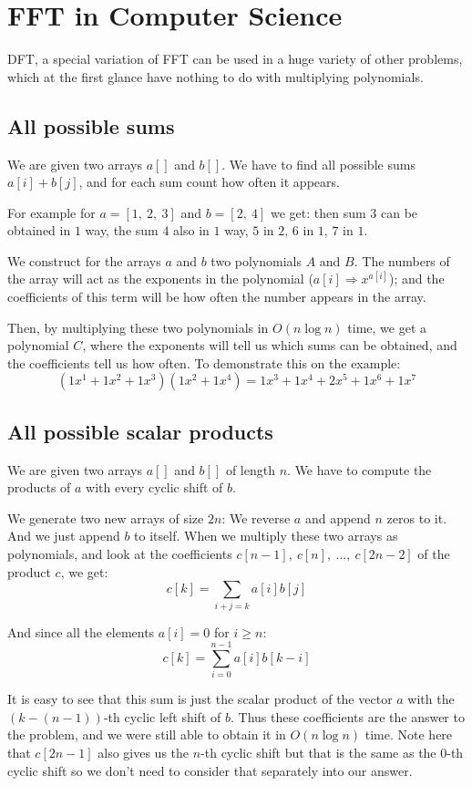 \documentclass{report}
\begin{document}
\section{FFT in Computer Science}
DFT, a special variation of FFT can be used in a huge variety of other problems, which at the first glance have nothing to do with multiplying polynomials.

\subsection{All possible sums}

We are given two arrays $a[]$ and $b[]$. We have to find all possible sums $a[i] + b[j]$, and for each sum count how often it appears.

For example for $a = [1,~ 2,~ 3]$ and $b = [2,~ 4]$ we get: then sum $3$ can be obtained in $1$ way, the sum $4$ also in $1$ way, $5$ in $2$, $6$ in $1$, $7$ in $1$.

We construct for the arrays $a$ and $b$ two polynomials $A$ and $B$. The numbers of the array will act as the exponents in the polynomial ($a[i] \Rightarrow x^{a[i]}$); and the coefficients of this term will be how often the number appears in the array.

Then, by multiplying these two polynomials in $O(n \log n)$ time, we get a polynomial $C$, where the exponents will tell us which sums can be obtained, and the coefficients tell us how often. To demonstrate this on the example:
$$(1 x^1 + 1 x^2 + 1 x^3) (1 x^2 + 1 x^4) = 1 x^3 + 1 x^4 + 2 x^5 + 1 x^6 + 1 x^7$$

\subsection{All possible scalar products}

We are given two arrays $a[]$ and $b[]$ of length $n$. We have to compute the products of $a$ with every cyclic shift of $b$.

We generate two new arrays of size $2n$: We reverse $a$ and append $n$ zeros to it. And we just append $b$ to itself. When we multiply these two arrays as polynomials, and look at the coefficients $c[n-1],~ c[n],~ \dots,~ c[2n-2]$ of the product $c$, we get:
$$c[k] = \sum_{i+j=k} a[i] b[j]$$

And since all the elements $a[i] = 0$ for $i \ge n$:
$$c[k] = \sum_{i=0}^{n-1} a[i] b[k-i]$$

It is easy to see that this sum is just the scalar product of the vector $a$ with the $(k - (n - 1))$-th cyclic left shift of $b$. Thus these coefficients are the answer to the problem, and we were still able to obtain it in $O(n \log n)$ time. Note here that $c[2n-1]$ also gives us the $n$-th cyclic shift but that is the same as the $0$-th cyclic shift so we don't need to consider that separately into our answer.
\end{document}
